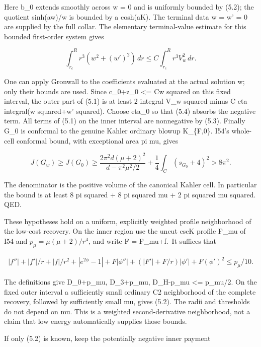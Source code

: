 \documentclass[
  10pt,
]{article}
\begin{document}
Here b\_0 extends smoothly across w = 0 and is uniformly bounded by
(5.2); the quotient sinh(aw)/w is bounded by a cosh(aK). The terminal
data w = w' = 0 are supplied by the full collar. The elementary
terminal-value estimate for this bounded first-order system gives

\[
 \int_{r_c}^{R}r^3(w^2+(w')^2)\,dr
                      \le C\int_{r_c}^{R}r^3V_w^2\,dr.  \tag{5.4}
\]

One can apply Gronwall to the coefficients evaluated at the actual
solution w; only their bounds are used. Since c\_0+z\_0 \textless= Cw
squared on this fixed interval, the outer part of (5.1) is at least 2
integral V\_w squared minus C eta integral(w squared+w' squared). Choose
eta\_0 so that (5.4) absorbs the negative term. All terms of (5.1) on
the inner interval are nonnegative by (5.3). Finally G\_0 is conformal
to the genuine Kahler ordinary blowup K\_\{F,0\}. I54's whole-cell
conformal bound, with exceptional area pi mu, gives

\[
 J(G_w)\ge J(G_0)\ge
       \frac{2\pi^2d(\mu+2)^2}{d-\pi^2\mu^2/2}
       +\frac14\int_C(s_{G_0}+4)^2
                    >8\pi^2.                           \tag{5.5}
\]

The denominator is the positive volume of the canonical Kahler cell. In
particular the bound is at least 8 pi squared + 8 pi squared mu + 2 pi
squared mu squared. QED.

These hypotheses hold on a uniform, explicitly weighted profile
neighborhood of the low-cost recovery. On the inner region use the uncut
cscK profile F\_mu of I54 and \(p_\mu=\mu(\mu+2)/r^4\), and write F =
F\_mu+f.~It suffices that

\[
\begin{aligned}
 |f''|+|f'|/r+|f|/r^2+|e^{2\phi}-1|
 +F|\phi''|+(|F'|+F/r)|\phi'|+F(\phi')^2
                                      \le p_\mu/10.
\end{aligned}\tag{5.6}
\]

The definitions give \textbar D\_0+p\_mu\textbar,
\textbar D\_3+p\_mu\textbar, \textbar D\_H-p\_mu\textbar{} \textless=
p\_mu/2. On the fixed outer interval a sufficiently small ordinary C2
neighborhood of the complete recovery, followed by sufficiently small
mu, gives (5.2). The radii and thresholds do not depend on mu. This is a
weighted second-derivative neighborhood, not a claim that low energy
automatically supplies those bounds.

If only (5.2) is known, keep the potentially negative inner payment
\end{document}
